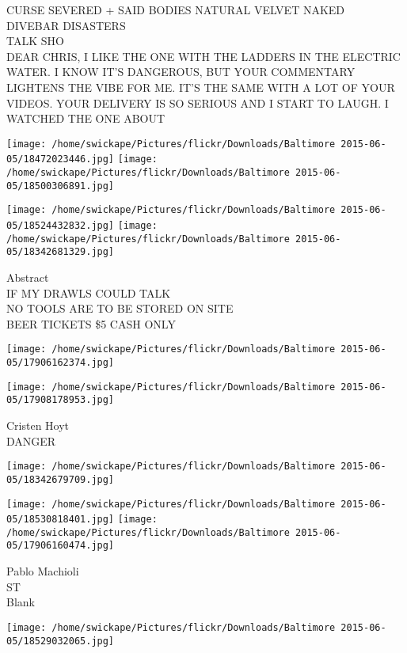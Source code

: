 \documentclass[10pt,letterpaper]{article}
\begin{document}
CURSE SEVERED  + SAID BODIES NATURAL VELVET NAKED\\
DIVEBAR DISASTERS\\
TALK SHO\\
DEAR CHRIS, I LIKE THE ONE WITH THE LADDERS IN THE ELECTRIC WATER.  I KNOW IT'S DANGEROUS, BUT YOUR COMMENTARY LIGHTENS THE VIBE FOR ME.  IT'S THE SAME WITH A LOT OF YOUR VIDEOS.  YOUR DELIVERY IS SO SERIOUS AND I START TO LAUGH.  I WATCHED THE ONE ABOUT\\
\pagebreak

\texttt{[image: /home/swickape/Pictures/flickr/Downloads/Baltimore 2015-06-05/18472023446.jpg]}
\texttt{[image: /home/swickape/Pictures/flickr/Downloads/Baltimore 2015-06-05/18500306891.jpg]}

\texttt{[image: /home/swickape/Pictures/flickr/Downloads/Baltimore 2015-06-05/18524432832.jpg]}
\texttt{[image: /home/swickape/Pictures/flickr/Downloads/Baltimore 2015-06-05/18342681329.jpg]}

Abstract\\
IF MY DRAWLS COULD TALK\\
NO TOOLS ARE TO BE STORED ON SITE\\
BEER TICKETS \$5 CASH ONLY\\
\pagebreak

\texttt{[image: /home/swickape/Pictures/flickr/Downloads/Baltimore 2015-06-05/17906162374.jpg]}

\vspace{0.25in}
\texttt{[image: /home/swickape/Pictures/flickr/Downloads/Baltimore 2015-06-05/17908178953.jpg]}

Cristen Hoyt\\
DANGER\\
\pagebreak

\texttt{[image: /home/swickape/Pictures/flickr/Downloads/Baltimore 2015-06-05/18342679709.jpg]}

\vspace{0.25in}
\texttt{[image: /home/swickape/Pictures/flickr/Downloads/Baltimore 2015-06-05/18530818401.jpg]}
\texttt{[image: /home/swickape/Pictures/flickr/Downloads/Baltimore 2015-06-05/17906160474.jpg]}

Pablo Machioli\\
ST\\
Blank\\
\pagebreak

\texttt{[image: /home/swickape/Pictures/flickr/Downloads/Baltimore 2015-06-05/18529032065.jpg]}
\end{document}
